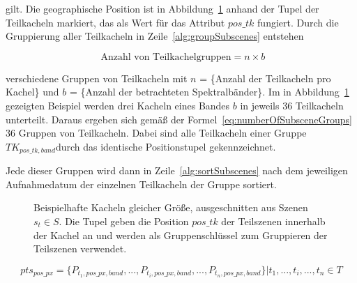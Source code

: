  gilt. Die geographische Position ist in Abbildung~\ref{fig:dataCubeSliced} anhand der Tupel der Teilkacheln markiert, das als Wert für das Attribut $pos\_tk$ fungiert. Durch die Gruppierung aller Teilkacheln in Zeile~\ref{alg:groupSubscenes} entstehen 

\begin{equation} \label{eq:numberOfSubsceneGroups}
\text{ Anzahl von Teilkachelgruppen} = n \times b
\end{equation}

 verschiedene Gruppen von Teilkacheln mit $n$ = \{Anzahl der Teilkacheln pro Kachel\} und $b$ = \{Anzahl der betrachteten Spektralbänder\}. Im in Abbildung~\ref{fig:dataCubeSliced} gezeigten Beispiel werden drei Kacheln eines Bandes $b$ in jeweils 36 Teilkacheln unterteilt. Daraus ergeben sich gemäß der Formel~\ref{eq:numberOfSubsceneGroups} 36 Gruppen von Teilkacheln. Dabei sind alle Teilkacheln einer Gruppe $TK_{pos\_tk, band}$durch das identische Positionstupel gekennzeichnet.

Jede dieser Gruppen wird dann in Zeile~\ref{alg:sortSubscenes} nach dem jeweiligen Aufnahmedatum der einzelnen Teilkacheln der Gruppe sortiert. 

\begin{figure}[H]
\centering

\caption{Beispielhafte Kacheln gleicher Größe, ausgeschnitten aus Szenen $s_t \in S$. Die Tupel geben die Position $pos\_tk$ der Teilszenen innerhalb der Kachel an und werden als Gruppenschlüssel zum Gruppieren der Teilszenen verwendet.} 
\label{fig:dataCubeSliced}
\end{figure}

\begin{equation} \label{eq:pixelTimeSeries}
pts_{pos\_px} = \{P_{t_1, pos\_px, band}, ..., P_{t_i, pos\_px, band}, ... , P_{t_n, pos\_px, band}\} | t_1, ..., t_i, ..., t_n \in T
\end{equation}


